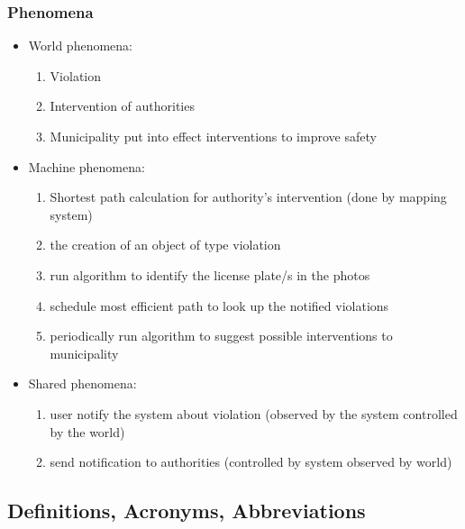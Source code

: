 \subsubsection{Phenomena}
\begin{itemize}
\item
World phenomena:
\begin{enumerate}
\item
Violation
\item
Intervention of authorities
\item
Municipality put into effect interventions to improve safety
\end{enumerate}
\item
Machine phenomena:	
\begin{enumerate}
\item
Shortest path calculation for authority’s intervention (done by mapping system)
\item
the creation of an object of type violation
\item
run algorithm to identify the license plate/s in the photos
\item
schedule most efficient path to look up the notified violations
\item
periodically run algorithm to suggest possible interventions to municipality
\end{enumerate}
\item
Shared phenomena:
\begin{enumerate}
\item
user notify the system about violation (observed by the system controlled by the world)
\item
send notification to authorities (controlled by system observed by world)
\end{enumerate}
\end{itemize}
\subsection{Definitions, Acronyms, Abbreviations}
